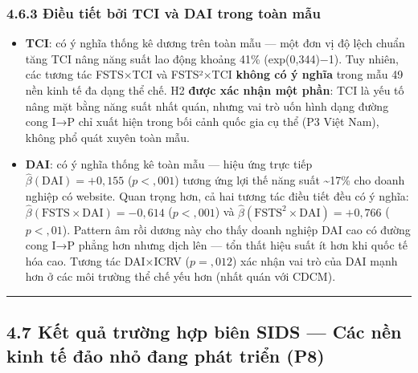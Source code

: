 \documentclass[12pt,a4paper]{article}
\providecommand{\tightlist}{\setlength{\itemsep}{0pt}\setlength{\parskip}{0pt}}
\begin{document}
\hypertarget{463-ux111iux1ec1u-tiux1ebft-bux1edfi-tci-vuxe0-dai-trong-touxe0n-mux1eabu}{%
\subsubsection{4.6.3 Điều tiết bởi TCI và DAI trong toàn
mẫu}\label{463-ux111iux1ec1u-tiux1ebft-bux1edfi-tci-vuxe0-dai-trong-touxe0n-mux1eabu}}

\begin{itemize}
\tightlist
\item
  \textbf{TCI}: có ý nghĩa thống kê dương trên toàn mẫu --- một đơn vị
  độ lệch chuẩn tăng TCI nâng năng suất lao động khoảng 41\%
  (exp(0,344)−1). Tuy nhiên, các tương tác FSTS×TCI và FSTS²×TCI
  \textbf{không có ý nghĩa} trong mẫu 49 nền kinh tế đa dạng thể chế. H2
  \textbf{được xác nhận một phần}: TCI là yếu tố nâng mặt bằng năng suất
  nhất quán, nhưng vai trò uốn hình dạng đường cong I→P chỉ xuất hiện
  trong bối cảnh quốc gia cụ thể (P3 Việt Nam), không phổ quát xuyên
  toàn mẫu.
\item
  \textbf{DAI}: có ý nghĩa thống kê toàn mẫu --- hiệu ứng trực tiếp
  \(\hat{\beta}(\text{DAI}) = +0{,}155\) (\(p < {,}001\)) tương ứng lợi
  thế năng suất \textasciitilde17\% cho doanh nghiệp có website. Quan
  trọng hơn, cả hai tương tác điều tiết đều có ý nghĩa:
  \(\hat{\beta}(\text{FSTS} \times \text{DAI}) = -0{,}614\)
  (\(p < {,}001\)) và
  \(\hat{\beta}(\text{FSTS}^2 \times \text{DAI}) = +0{,}766\)
  (\(p < {,}01\)). Pattern âm rồi dương này cho thấy doanh nghiệp DAI
  cao có đường cong I→P phẳng hơn nhưng dịch lên --- tổn thất hiệu suất
  ít hơn khi quốc tế hóa cao. Tương tác DAI×ICRV (\(p = {,}012\)) xác
  nhận vai trò của DAI mạnh hơn ở các môi trường thể chế yếu hơn (nhất
  quán với CDCM).
\end{itemize}

\begin{center}\rule{0.5\linewidth}{0.5pt}\end{center}

\hypertarget{47-kux1ebft-quux1ea3-trux1b0ux1eddng-hux1ee3p-biuxean-sids--cuxe1c-nux1ec1n-kinh-tux1ebf-ux111ux1ea3o-nhux1ecf-ux111ang-phuxe1t-triux1ec3n-p8}{%
\subsection{4.7 Kết quả trường hợp biên SIDS --- Các nền kinh tế đảo nhỏ
đang phát triển
(P8)}\label{47-kux1ebft-quux1ea3-trux1b0ux1eddng-hux1ee3p-biuxean-sids--cuxe1c-nux1ec1n-kinh-tux1ebf-ux111ux1ea3o-nhux1ecf-ux111ang-phuxe1t-triux1ec3n-p8}}
\end{document}
